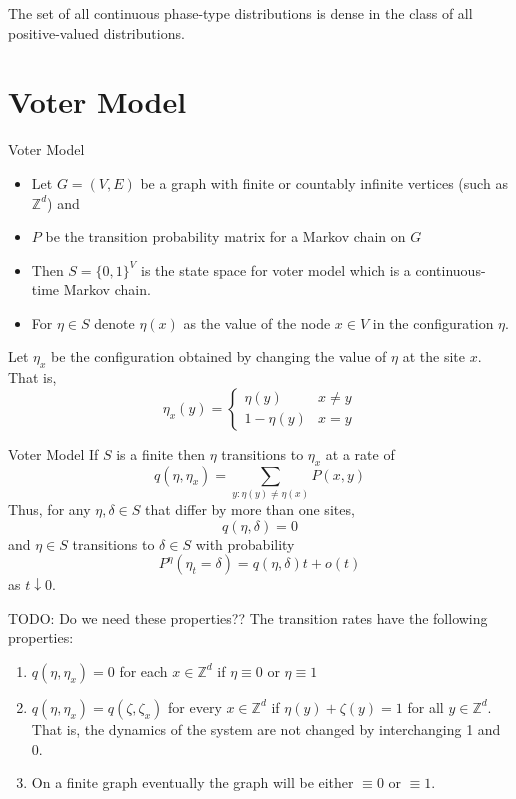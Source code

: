\documentclass{beamer}
\theoremstyle{definition}
\newcommand{\Z}{\mathbb{Z}}
\begin{document}
\begin{frame}
    The set of all continuous phase-type distributions is dense in the class of all positive-valued distributions.
\end{frame}


\section{Voter Model}

\begin{frame}{Voter Model}
\begin{itemize}
    \item Let $G = (V,E)$ be a graph with finite or countably infinite vertices (such as $\Z^d$) and 
    \item $P$ be the transition probability matrix for a Markov chain on $G$
    \item Then $S = \{0,1\}^{V}$ is the state space for voter model which is a continuous-time Markov chain.
    \item For $\eta \in S$ denote $\eta(x)$ as the value of the node $x \in V$ in the configuration $\eta$.
\end{itemize}

Let $\eta_x$ be the configuration obtained by changing the value of $\eta$ at the site $x$. That is,
$$
\eta_x(y) = \begin{cases}
    \eta(y) & x \not = y\\
    1 - \eta(y) & x = y
\end{cases}
$$
\end{frame}

\begin{frame}{Voter Model}
If $S$ is a finite then $\eta$ transitions to $\eta_x$ at a rate of
$$
q(\eta, \eta_x) = \sum_{y : \eta(y) \not = \eta(x)} P(x,y)
$$
Thus, for any $\eta, \delta \in S$ that differ by more than one sites,
$$
q(\eta, \delta) = 0
$$
and $\eta \in S$ transitions to $\delta \in S$ with probability
$$
P^\eta(\eta_t = \delta) = q(\eta, \delta) t + o(t)
$$
as $t \downarrow 0$.
\end{frame}

\begin{frame}
TODO: Do we need these properties??
The transition rates have the following properties:
\begin{enumerate}
    \item $q(\eta, \eta_x) = 0$ for each $x \in \Z^d$ if $\eta \equiv 0$ or $\eta \equiv 1$
    \item $q(\eta, \eta_x) = q(\zeta, \zeta_x)$ for every $x \in \Z^d$ if $\eta(y) + \zeta(y) = 1$ for all $y \in \Z^d$. That is, the dynamics of the system are not changed by interchanging 1 and 0.
    \item On a finite graph eventually the graph will be either $\equiv 0$ or $\equiv 1$.
\end{enumerate}
\end{frame}
\end{document}
